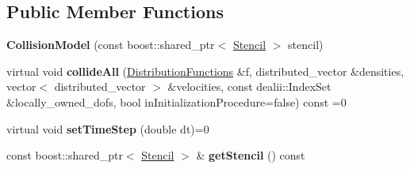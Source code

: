 \subsection*{Public Member Functions}
\begin{DoxyCompactItemize}
\item 
\hypertarget{classnatrium_1_1CollisionModel_a4443d1f7ca0cc11ef6d5cc340c1076c9}{
{\bfseries CollisionModel} (const boost::shared\_\-ptr$<$ \hyperlink{classnatrium_1_1Stencil}{Stencil} $>$ stencil)}
\label{classnatrium_1_1CollisionModel_a4443d1f7ca0cc11ef6d5cc340c1076c9}

\item 
\hypertarget{classnatrium_1_1CollisionModel_ac6c6d95633d62209a04528af86807025}{
virtual void {\bfseries collideAll} (\hyperlink{classnatrium_1_1DistributionFunctions}{DistributionFunctions} \&f, distributed\_\-vector \&densities, vector$<$ distributed\_\-vector $>$ \&velocities, const dealii::IndexSet \&locally\_\-owned\_\-dofs, bool inInitializationProcedure=false) const =0}
\label{classnatrium_1_1CollisionModel_ac6c6d95633d62209a04528af86807025}

\item 
\hypertarget{classnatrium_1_1CollisionModel_aa0df0674bc26821d037323ac184fb52b}{
virtual void {\bfseries setTimeStep} (double dt)=0}
\label{classnatrium_1_1CollisionModel_aa0df0674bc26821d037323ac184fb52b}

\item 
\hypertarget{classnatrium_1_1CollisionModel_ac10edd12e081a6eb48a36568f1bc1c0f}{
const boost::shared\_\-ptr$<$ \hyperlink{classnatrium_1_1Stencil}{Stencil} $>$ \& {\bfseries getStencil} () const }
\label{classnatrium_1_1CollisionModel_ac10edd12e081a6eb48a36568f1bc1c0f}


\end{DoxyCompactItemize}
